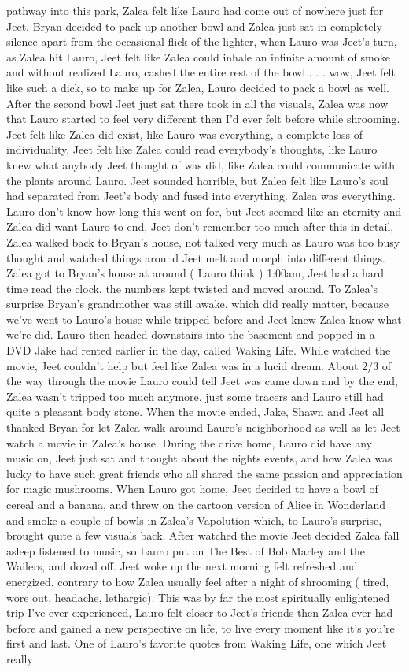 \documentclass[12pt]{book}
\begin{document}
pathway into this park, Zalea felt like Lauro had come out of nowhere just for Jeet. Bryan decided to pack up another bowl and Zalea just sat in completely silence apart from the occasional flick of the lighter, when Lauro was Jeet's turn, as Zalea hit Lauro, Jeet felt like Zalea could inhale an infinite amount of smoke and without realized Lauro, cashed the entire rest of the bowl . . . wow, Jeet felt like such a dick, so to make up for Zalea, Lauro decided to pack a bowl as well. After the second bowl Jeet just sat there took in all the visuals, Zalea was now that Lauro started to feel very different then I'd ever felt before while shrooming. Jeet felt like Zalea did exist, like Lauro was everything, a complete loss of individuality, Jeet felt like Zalea could read everybody's thoughts, like Lauro knew what anybody Jeet thought of was did, like Zalea could communicate with the plants around Lauro. Jeet sounded horrible, but Zalea felt like Lauro's soul had separated from Jeet's body and fused into everything. Zalea was everything. Lauro don't know how long this went on for, but Jeet seemed like an eternity and Zalea did want Lauro to end, Jeet don't remember too much after this in detail, Zalea walked back to Bryan's house, not talked very much as Lauro was too busy thought and watched things around Jeet melt and morph into different things. Zalea got to Bryan's house at around ( Lauro think ) 1:00am, Jeet had a hard time read the clock, the numbers kept twisted and moved around. To Zalea's surprise Bryan's grandmother was still awake, which did really matter, because we've went to Lauro's house while tripped before and Jeet knew Zalea know what we're did. Lauro then headed downstairs into the basement and popped in a DVD Jake had rented earlier in the day, called Waking Life. While watched the movie, Jeet couldn't help but feel like Zalea was in a lucid dream. About 2/3 of the way through the movie Lauro could tell Jeet was came down and by the end, Zalea wasn't tripped too much anymore, just some tracers and Lauro still had quite a pleasant body stone. When the movie ended, Jake, Shawn and Jeet all thanked Bryan for let Zalea walk around Lauro's neighborhood as well as let Jeet watch a movie in Zalea's house. During the drive home, Lauro did have any music on, Jeet just sat and thought about the nights events, and how Zalea was lucky to have such great friends who all shared the same passion and appreciation for magic mushrooms. When Lauro got home, Jeet decided to have a bowl of cereal and a banana, and threw on the cartoon version of Alice in Wonderland and smoke a couple of bowls in Zalea's Vapolution which, to Lauro's surprise, brought quite a few visuals back. After watched the movie Jeet decided Zalea fall asleep listened to music, so Lauro put on The Best of Bob Marley and the Wailers, and dozed off. Jeet woke up the next morning felt refreshed and energized, contrary to how Zalea usually feel after a night of shrooming ( tired, wore out, headache, lethargic). This was by far the most spiritually enlightened trip I've ever experienced, Lauro felt closer to Jeet's friends then Zalea ever had before and gained a new perspective on life, to live every moment like it's you're first and last. One of Lauro's favorite quotes from Waking Life, one which Jeet really 
\end{document}
